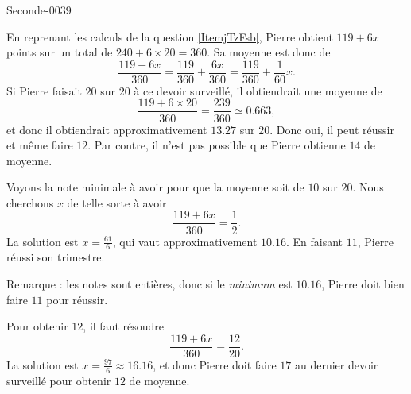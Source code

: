 \begin{corrige}{Seconde-0039}
\begin{enumerate}
En reprenant les calculs de la question \ref{ItemjTzFsb}, Pierre obtient \( 119+6x\) points sur un total de \( 240+6\times 20=360\). Sa moyenne est donc de
\begin{equation}
    \frac{ 119+6x }{ 360 }=\frac{ 119 }{ 360 }+\frac{ 6x }{ 360 }=\frac{ 119 }{ 360 }+\frac{1}{ 60 }x.
\end{equation}
Si Pierre faisait \( 20\) sur \( 20\) à ce devoir surveillé, il obtiendrait une moyenne de
\begin{equation}
    \frac{ 119+6\times 20 }{ 360 }=\frac{ 239 }{ 360 }\simeq 0.663,
\end{equation}
et donc il obtiendrait approximativement \( 13.27\) sur \( 20\). Donc oui, il peut réussir et même faire \( 12\). Par contre, il n'est pas possible que Pierre obtienne \( 14\) de moyenne.

Voyons la note minimale à avoir pour que la moyenne soit de \( 10\) sur \( 20\). Nous cherchons \( x\) de telle sorte à avoir
\begin{equation}
    \frac{ 119+6x }{ 360 }=\frac{ 1 }{2}.
\end{equation}
La solution est \( x=\frac{ 61 }{ 6 }\), qui vaut approximativement \( 10.16\). En faisant \( 11\), Pierre réussi son trimestre. 

Remarque : les notes sont entières, donc si le \emph{minimum} est \( 10.16\), Pierre doit bien faire \( 11\) pour réussir.

Pour obtenir \( 12\), il faut résoudre
\begin{equation}
    \frac{ 119+6x }{ 360 }=\frac{ 12 }{20}.
\end{equation}
La solution est \( x=\frac{ 97 }{ 6 }\approx 16.16\), et donc Pierre doit faire \( 17\) au dernier devoir surveillé pour obtenir \( 12\) de moyenne.

    \end{enumerate}

\end{corrige}
